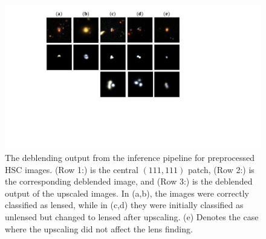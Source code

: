 \documentclass[12pt, twocolumn, apj]{openjournal}
\begin{document}
\begin{figure}[!t]
\centering
\includegraphics[width=0.85\linewidth]{Figures/HSC_results3.pdf}
\caption{The deblending output from the inference pipeline for preprocessed HSC images. (Row 1:) is the central $(111,111)$ patch, (Row 2:) is the corresponding deblended image, and (Row 3:) is the deblended output of the upscaled images. In (a,b), the images were correctly classified as lensed, while in (c,d) they were initially classified as unlensed but changed to lensed after upscaling. (e) Denotes the case where the upscaling did not affect the lens finding. }
\label{Fig:HSC_results} 
\end{figure}
\end{document}
